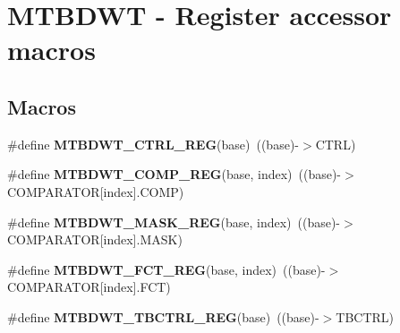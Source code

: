 \hypertarget{group___m_t_b_d_w_t___register___accessor___macros}{}\section{M\+T\+B\+D\+WT -\/ Register accessor macros}
\label{group___m_t_b_d_w_t___register___accessor___macros}
\subsection*{Macros}
\begin{DoxyCompactItemize}
\item 
\mbox{\label{group___m_t_b_d_w_t___register___accessor___macros_gab63fe70f69879777db30d18d5407e158}} 
\#define {\bfseries M\+T\+B\+D\+W\+T\+\_\+\+C\+T\+R\+L\+\_\+\+R\+EG}(base)~((base)-\/$>$C\+T\+RL)
\item 
\mbox{\label{group___m_t_b_d_w_t___register___accessor___macros_ga0204594297d9a6d44fe19d610913a7aa}} 
\#define {\bfseries M\+T\+B\+D\+W\+T\+\_\+\+C\+O\+M\+P\+\_\+\+R\+EG}(base,  index)~((base)-\/$>$C\+O\+M\+P\+A\+R\+A\+T\+OR\mbox{[}index\mbox{]}.C\+O\+MP)
\item 
\mbox{\label{group___m_t_b_d_w_t___register___accessor___macros_ga32be33e09a6c10c58485d2beefb6facf}} 
\#define {\bfseries M\+T\+B\+D\+W\+T\+\_\+\+M\+A\+S\+K\+\_\+\+R\+EG}(base,  index)~((base)-\/$>$C\+O\+M\+P\+A\+R\+A\+T\+OR\mbox{[}index\mbox{]}.M\+A\+SK)
\item 
\mbox{\label{group___m_t_b_d_w_t___register___accessor___macros_ga6bb0978c19eed749885efdb3c899edab}} 
\#define {\bfseries M\+T\+B\+D\+W\+T\+\_\+\+F\+C\+T\+\_\+\+R\+EG}(base,  index)~((base)-\/$>$C\+O\+M\+P\+A\+R\+A\+T\+OR\mbox{[}index\mbox{]}.F\+CT)
\item 
\mbox{\label{group___m_t_b_d_w_t___register___accessor___macros_ga42ec173a2526de3b3d082bd99a19b6a5}} 
\#define {\bfseries M\+T\+B\+D\+W\+T\+\_\+\+T\+B\+C\+T\+R\+L\+\_\+\+R\+EG}(base)~((base)-\/$>$T\+B\+C\+T\+RL)
\item 

\end{DoxyCompactItemize}
